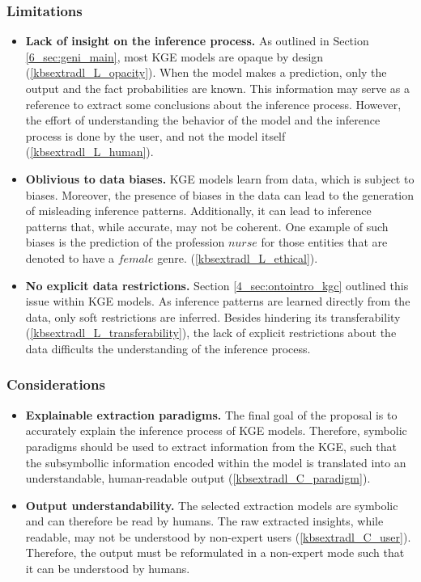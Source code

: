 \subsubsection*{Limitations}
\begin{itemize}
    \item \textbf{Lack of insight on the inference process.} As outlined in Section \ref{6_sec:geni_main}, most KGE models are opaque by design (\ref{kbsextradl_L_opacity}). When the model makes a prediction, only the output and the fact probabilities are known. This information may serve as a reference to extract some conclusions about the inference process. However, the effort of understanding the behavior of the model and the inference process is done by the user, and not the model itself (\ref{kbsextradl_L_human}).
    
    \item \textbf{Oblivious to data biases.} KGE models learn from data, which is subject to biases. Moreover, the presence of biases in the data can lead to the generation of misleading inference patterns. Additionally, it can lead to inference patterns that, while accurate, may not be coherent. One example of such biases is the prediction of the profession $nurse$ for those entities that are denoted to have a $female$ genre. (\ref{kbsextradl_L_ethical}). 
    
    \item \textbf{No explicit data restrictions.} Section \ref{4_sec:ontointro_kgc} outlined this issue within KGE models. As inference patterns are learned directly from the data, only soft restrictions are inferred. Besides hindering its transferability (\ref{kbsextradl_L_transferability}), the lack of explicit restrictions about the data difficults the understanding of the inference process.
\end{itemize}

\subsubsection*{Considerations}
\begin{itemize}
    \item \textbf{Explainable extraction paradigms.} The final goal of the proposal is to accurately explain the inference process of KGE models. Therefore, symbolic paradigms should be used to extract information from the KGE, such that the subsymbollic information encoded within the model is translated into an understandable, human-readable output (\ref{kbsextradl_C_paradigm}). 
    
    \item \textbf{Output understandability.} The selected extraction models are symbolic and can therefore be read by humans. The raw extracted insights, while readable, may not be understood by non-expert users (\ref{kbsextradl_C_user}). Therefore, the output must be reformulated in a non-expert mode such that it can be understood by humans.
\end{itemize}

